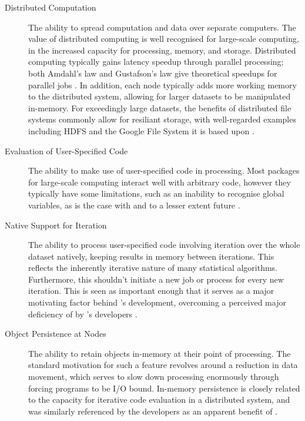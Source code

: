 \begin{description}
  \item[Distributed Computation]
    The ability to spread computation and data over separate computers. The
    value of distributed computing is well recognised for large-scale
    computing, in the increased capacity for processing, memory, and
    storage. Distributed computing typically gains latency speedup through
    parallel processing; both Amdahl's law and Gustafson's law give
    theoretical speedups for parallel jobs \cites{amdahl1967law,gustafson1988law}. In addition, each node typically adds more working
    memory to the distributed system, allowing for larger datasets to be
    manipulated in-memory. For exceedingly large datasets, the benefits of
    distributed file systems commonly allow for resiliant storage, with
    well-regarded examples including HDFS and the Google File System it is
    based upon \cites{shvachko2010hadoop,ghemawat2003google}.
  \item[Evaluation of User-Specified Code]
    The ability to make use of user-specified code in processing. Most \R{}
    packages for large-scale computing interact well with arbitrary code,
    however they typically have some limitations, such as an inability to
    recognise global variables, as is the case with  and to a lesser
    extent future \cites{sparklyr2020limitations,microsoft20}.
  \item[Native Support for Iteration]
    The ability to process user-specified code involving iteration over the
    whole dataset natively, keeping results in memory between iterations.
    This reflects the inherently iterative nature of many statistical
    algorithms. Furthermore, this shouldn't initiate a new job or process
    for every new iteration. This is seen as important enough that it serves
    as a major motivating factor behind 's development, overcoming a
    perceived major deficiency of  by 's developers
    \cite{zaharia2010spark}.
  \item[Object Persistence at Nodes]
    The ability to retain objects in-memory at their point of processing.
    The standard motivation for such a feature revolves around a reduction
    in data movement, which serves to slow down processing enormously
    through forcing programs to be I/O bound. In-memory persistence is
    closely related to the capacity for iterative code evaluation in a
    distributed system, and was similarly referenced by the  developers
    as an apparent benefit of \cite{zaharia2010spark}.

\end{description}
